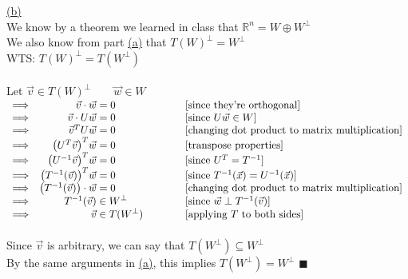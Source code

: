 \documentclass[12pt]{article}
\newcommand{\R}{\mathbb{R}}
\renewcommand{\qed}{\hfill$\blacksquare$}
\begin{document}
\hyperlink{toc}{\hypertarget{2.2}{(b)}}\\
We know by a theorem we learned in class that $\R^n =W \oplus W^{\perp}$\\
We also know from part \hyperlink{2.1}{(a)} that  $T(W)^\perp = W^\perp$\\
WTS: $T(W)^\perp = T(W^\perp)$
\\\\
Let $\vec{v} \in T(W)^\perp \qquad \vec{w}\in W$\\
{$\begin{array}{lr@{}>{\displaystyle}ll}
		\Longrightarrow & \vec{v} \cdot \vec{w}                    & {}=0 \hspace*{20mm} & [\text{since they're orthogonal}]                      \\
		\Longrightarrow & \vec{v} \cdot U\vec{w}                   & {}=0                & [\text{since } U\vec{w} \in W]                         \\
		\Longrightarrow & \vec{v}^T  U\vec{w}                      & {}=0                & [\text{changing dot product to matrix multiplication}] \\
		\Longrightarrow & \big(U^T \vec{v}\big)^T \vec{w}          & {}=0                & [\text{transpose properties}]                          \\
		\Longrightarrow & \big(U^{-1} \vec{v}\big)^T \vec{w}       & {}=0                & [\text{since }U^T = T^{-1}]                            \\
		\Longrightarrow & \big(T^{-1} (\vec{v})\big)^T \vec{w}     & {}=0                & [\text{since } T^{-1}(\vec{x}) = U^{-1}(\vec{x})]      \\
		\Longrightarrow & \big(T^{-1} (\vec{v})\big) \cdot \vec{w} & {}=0                & [\text{changing dot product to matrix multiplication}] \\
		\Longrightarrow & T^{-1} (\vec{v})                         & {}\in W^\perp       & [\text{since } \vec{w} \perp T^{-1} (\vec{v})]         \\
		\Longrightarrow & \vec{v}                                  & {}\in T(W^\perp)    & [\text{applying }T \text{ to both sides}]              \\
	\end{array}$}
\\\\
Since $\vec{v}$ is arbitrary, we can say that $T(W^\perp) \subseteq W^\perp$ \\
By the same arguments in \hyperlink{2.1}{(a)}, this implies $T(W^\perp) = W^\perp$ \qed
\end{document}
